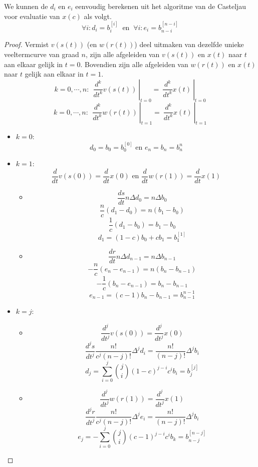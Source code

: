 \documentclass[computergesteund_ontwerp_van_curven_en_oppervlakken.tex]{subfiles}
\begin{document}
\begin{st}
We kunnen de $d_i$ en $e_i$ eenvoudig berekenen uit het algoritme van de Casteljau voor evaluatie van $x(c)$ als volgt.
\[
\forall i: d_i = b_{i}^{[i]}\ \text{ en }\ \forall i: e_i = b_{n-i}^{[n-i]}
\]
\begin{proof}
Vermist $v(s(t))$ (en $w(r(t))$) deel uitmaken van dezelfde unieke veeltermcurve van graad $n$, zijn alle afgeleiden van $v(s(t))$ en $x(t)$ naar $t$ aan elkaar gelijk in $t=0$. Bovendien zijn alle afgeleiden van $w(r(t))$ en $x(t)$ naar $t$ gelijk aan elkaar in $t=1$.
\[
k = 0,\cdots,n:\
\left.\ \frac{d^{k}}{dt^{k}}v(s(t))\ \right|_{t=0} = \left.\  \frac{d^{k}}{dt^{k}}x(t)\ \right|_{t=0} 
\] 
\[
k = 0,\cdots,n:\
\left.\ \frac{d^{k}}{dt^{k}}w(r(t))\ \right|_{t=1} = \left.\  \frac{d^{k}}{dt^{k}}x(t)\ \right|_{t=1} 
\] 

\begin{itemize}
\item $k=0$:
\[
d_0 = b_0 =b_0^{[0]} \text{ en } e_n = b_n = b_{n}^{n}
\]

\item $k=1$:
\[
\frac{d}{dt}v(s(0)) = \frac{d}{dt}x(0) \text{ en } \frac{d}{dt}w(r(1)) = \frac{d}{dt}x(1)
\]
\begin{itemize}
\item
\[
\frac{ds}{dt}n\Delta d_0 = n\Delta b_0
\]
\[
\frac{n}{c}(d_1-d_0) = n(b_1-b_0)
\]
\[
\frac{1}{c}(d_1-b_0) = b_1-b_0
\]
\[
d_1 = (1-c)b_0+cb_1 = b_1^{[1]}
\]

\item
\[
\frac{dr}{dt}n\Delta d_{n-1} = n\Delta b_{n-1}
\]
\[
-\frac{n}{c}(e_n-e_{n-1}) = n(b_{n}-b_{n-1})
\]
\[
-\frac{1}{c}(b_{n}-e_{n-1}) = b_{n} - b_{n-1}
\]
\[
e_{n-1} = (c-1)b_{n} - b_{n-1} = b_{n-1}^{n-1}
\]

\end{itemize}

\item $k=j$:
\begin{itemize}
\item
\[
\frac{d^{j}}{dt^{j}}v(s(0)) = \frac{d^{j}}{dt^{j}}x(0)
\]
\[
\frac{d^{j}s}{dt^{j}}\frac{n!}{c^j(n-j)!}\Delta^{j}d_i
= \frac{n!}{(n-j)!}\Delta^{j}b_i
\]
\[
d_{j} = \sum_{i=0}^j{j \choose i}(1-c)^{j-i}c^ib_i= b_j^{[j]}
\]

\item
\[
\frac{d^{j}}{dt^{j}}w(r(1)) = \frac{d^{j}}{dt^{j}}x(1)
\]
\[
\frac{d^{j}r}{dt^{j}}\frac{n!}{c^j(n-j)!}\Delta^{j}e_i
= \frac{n!}{(n-j)!}\Delta^{j}b_i
\]
\[
e_{j} = -\sum_{i=0}^j{j \choose i}(c-1)^{j-i}c^ib_k= b_{n-j}^{[n-j]}
\]
\end{itemize}
\end{itemize}
\end{proof}
\end{st}
\end{document}
